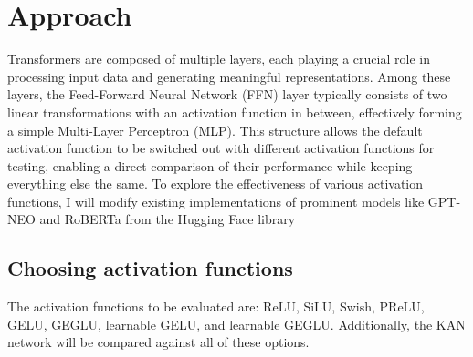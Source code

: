 \clearpage
\section{Approach}




Transformers are composed of multiple layers, each playing a crucial role in processing input data and generating meaningful representations. Among these layers, the Feed-Forward Neural Network (FFN) layer typically consists of two linear transformations with an activation function in between, effectively forming a simple Multi-Layer Perceptron (MLP). This structure allows the default activation function to be switched out with different activation functions for testing, enabling a direct comparison of their performance while keeping everything else the same. To explore the effectiveness of various activation functions, I will modify existing implementations of prominent models like GPT-NEO and RoBERTa from the Hugging Face library

\subsection{Choosing activation functions}
The activation functions to be evaluated are: ReLU, SiLU, Swish, PReLU, GELU, GEGLU, learnable GELU, and learnable GEGLU. Additionally, the KAN network will be compared against all of these options.

